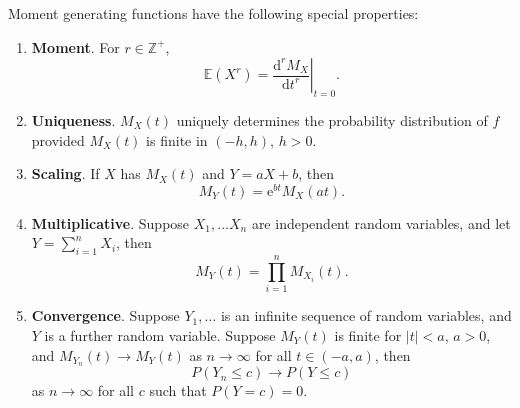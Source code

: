 \documentclass[letter-paper]{tufte-book}
\newcommand{\ex}{\mathrm{e}}
\newcommand\Def[1]{\textbf{#1}}
\begin{document}
Moment generating functions have the following special properties:
\begin{enumerate}
  \item \Def{Moment}. For $r\in\mathbb{Z}^+$,
  \begin{equation*}
    \mathbb{E}(X^r) = \left.\frac{\mathrm{d}^r M_X}{\mathrm{d}t^r}\right|_{t=0}.
  \end{equation*}
  
  \item \Def{Uniqueness}. $M_X(t)$ uniquely determines the probability
  distribution of $f$ provided $M_X(t)$ is finite in $(-h,h)$, $h>0$.
  
  \item \Def{Scaling}. If $X$ has $M_X(t)$ and $Y = aX + b$, then
  \begin{equation*}
    M_Y(t) = \ex^{bt} M_X(at).
  \end{equation*}
  
  \item \Def{Multiplicative}. Suppose $X_1,\ldots X_n$ are independent
  random variables, and let $Y = \sum_{i=1}^n X_i$, then
  \begin{equation*}
    M_Y(t) = \prod_{i=1}^n M_{X_{i}}(t).
  \end{equation*}
  
  \item \Def{Convergence}. Suppose $Y_1,\ldots$ is an infinite sequence of
  random variables, and $Y$ is a further random variable. Suppose $M_Y(t)$ is
  finite for $|t|<a$, $a>0$, and $M_{Y_n}(t) \to M_Y(t)$ as $n \to \infty$ for
  all $t\in(-a,a)$, then
  \begin{equation*}
    P(Y_n \leq c) \to P(Y \leq c)
  \end{equation*}
  as $n\to\infty$ for all $c$ such that $P(Y=c) = 0$.
\end{enumerate}
\end{document}
